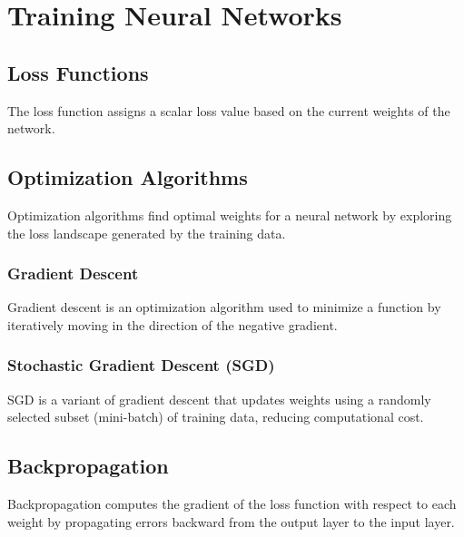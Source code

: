 \documentclass[a4paper,12pt]{article}
\begin{document}
\section{Training Neural Networks}

\subsection{Loss Functions}
\begin{tcolorbox}[colback=blue!5!white,colframe=blue!75!black,title=Loss Function]
  The loss function assigns a scalar loss value based on the current weights of the network.
\end{tcolorbox}

\subsection{Optimization Algorithms}
Optimization algorithms find optimal weights for a neural network by exploring the loss
landscape generated by the training data.

\subsubsection{Gradient Descent}
\begin{tcolorbox}[colback=blue!5!white,colframe=blue!75!black,title=Gradient Descent]
  Gradient descent is an optimization algorithm used to minimize a function by iteratively moving in the direction of
  the negative gradient.
\end{tcolorbox}

\subsubsection{Stochastic Gradient Descent (SGD)}
\begin{tcolorbox}[colback=blue!5!white,colframe=blue!75!black,title=Stochastic Gradient Descent]
  SGD is a variant of gradient descent that updates weights using a randomly selected subset (mini-batch) of
  training data, reducing computational cost.
\end{tcolorbox}

\subsection{Backpropagation}
Backpropagation computes the gradient of the loss function with respect to each weight by propagating 
errors backward from the output layer to the input layer.
\end{document}
